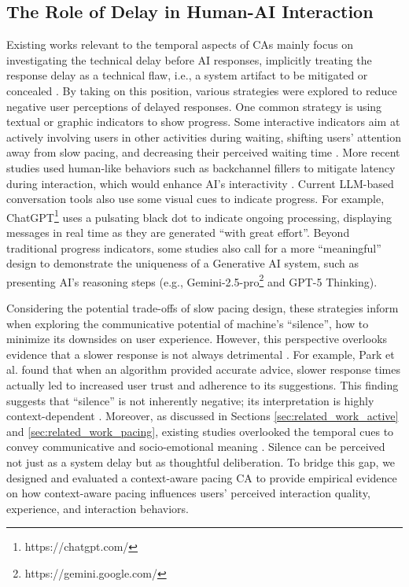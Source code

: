 \subsection{The Role of Delay in Human-AI Interaction}
\label{sec:related_work_artifact}
Existing works relevant to the temporal aspects of CAs mainly focus on investigating the technical delay before AI responses, implicitly treating the response delay as a technical flaw, i.e., a system artifact to be mitigated or concealed \cite{10.1145/3719160.3736636}. 
By taking on this position, various strategies were explored to reduce negative user perceptions of delayed responses. One common strategy is using textual or graphic indicators to show progress. Some interactive indicators aim at actively involving users in other activities during waiting, shifting users' attention away from slow pacing, and decreasing their perceived waiting time \cite{10.1145/3552327.3552329}. More recent studies used human-like behaviors such as backchannel fillers to mitigate latency during interaction, which would enhance AI's interactivity \cite{lopez2019testing, 10.1145/3290607.3312913, 10.1145/3472307.3484181, christenfeld1995does, 7745134}. Current LLM-based conversation tools also use some visual cues to indicate progress. For example, ChatGPT\footnote{https://chatgpt.com/} uses a pulsating black dot to indicate ongoing processing, displaying messages in real time as they are generated ``with great effort''. Beyond traditional progress indicators, some studies also call for a more ``meaningful'' design to demonstrate the uniqueness of a Generative AI system, such as presenting AI's reasoning steps \cite{10.1145/3706599.3719725} (e.g., Gemini-2.5-pro\footnote{https://gemini.google.com/} and GPT-5 Thinking).

Considering the potential trade-offs of slow pacing design, these strategies inform when exploring the communicative potential of machine's ``silence'', how to minimize its downsides on user experience. However, this perspective overlooks evidence that a slower response is not always detrimental \cite{yang_ai_2022}. For example, Park et al. \cite{park2019slow} found that when an algorithm provided accurate advice, slower response times actually led to increased user trust and adherence to its suggestions. This finding suggests that ``silence'' is not inherently negative; its interpretation is highly context-dependent \cite{10.1145/3472307.3484181}. Moreover, as discussed in Sections \ref{sec:related_work_active} and \ref{sec:related_work_pacing}, existing studies overlooked the temporal cues to convey communicative and socio-emotional meaning \cite{templeton2023listening}. Silence can be perceived not just as a system delay but as thoughtful deliberation. To bridge this gap, we designed and evaluated a context-aware pacing CA to provide empirical evidence on how context-aware pacing influences users' perceived interaction quality, experience, and interaction behaviors.

